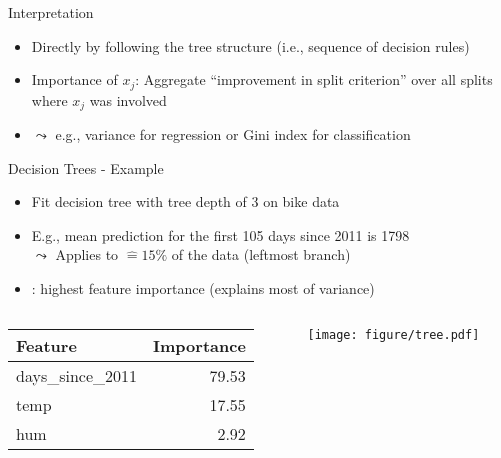 \documentclass[11pt,compress,t,notes=noshow, aspectratio=169, xcolor=table]{beamer}
\begin{document}
\begin{frame}{Interpretation}
\begin{itemize}
    \item Directly by following the tree structure (i.e., sequence of decision rules)
    \item Importance of $x_j$: Aggregate ``improvement in split criterion'' over all splits where $x_j$ was involved\\
    \item[] $\leadsto$ e.g., variance for regression or Gini index for classification
\end{itemize}

\end{frame}



\begin{frame}{Decision Trees - Example}
\begin{itemize}
    \item Fit decision tree with tree depth of 3 on bike data
    \item E.g., mean prediction for the first 105 days since 2011 is 1798\\
    $\leadsto$ Applies to $\hat = 15\%$ of the data (leftmost branch)
    \item {}: highest feature importance (explains most of variance)
\end{itemize}
\begin{columns}[T, totalwidth=\textwidth]
\begin{column}{0.37\textwidth}
\vspace{1.5cm}
\begin{table}[ht]
\centering
\scriptsize
\begin{tabular}{lr}
  \hline
 Feature & Importance \\
  \hline
days\_since\_2011 & 79.53 \\ 
  temp & 17.55 \\ 
  hum & 2.92 \\ 
   \hline
\end{tabular}
\end{table}
\end{column}
\begin{column}{0.63\textwidth}
  \texttt{[image: figure/tree.pdf]} 
\end{column}
\end{columns}
 
\end{frame}
\end{document}
